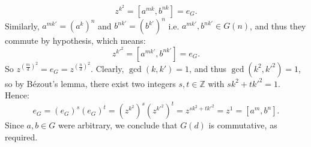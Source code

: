 \begin{solution}
    \[
        z^{k^2}=\left[a^{mk}, b^{nk}\right] = e_G.
    \]
    Similarly, \( a^{mk'}=\left(a^k\right)^{n} \) and \( b^{nk'}=\left(b^{k'}\right)^{n} \) i.e. \( a^{mk'},b^{nk'}\in G\left(n\right) \), and thus they commute by hypothesis, which means:
    \[
        z^{k'^2}=\left[a^{mk'}, b^{nk'}\right] = e_G.
    \]
    So \( z^{\left(\frac{m}{d}\right)^2}=e_G=z^{\left(\frac{n}{d}\right)^2} \). Clearly, \( \gcd\left(k,k'\right)=1 \), and thus \( \gcd\left(k^2,k'^2\right)=1 \), so by Bézout's lemma, there exist two integers \( s,t\in\mathbb{Z} \) with \( s k^2 + t k'^2=1 \). Hence:
    \[
        e_G=\left(e_G\right)^s \left(e_G\right)^t=\left(z^{k^2}\right)^s \left(z^{k'^2}\right)^t=z^{s k^2 + t k'^2}=z^1=\left[a^m, b^n\right].
    \]
    Since \( a,b\in G \) were arbitrary, we conclude that \( G\left(d\right) \) is commutative, as required.
\end{solution}

